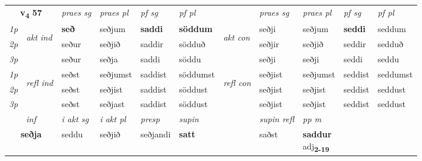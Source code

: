 \noindent
\begin{tabular}{lllllllllll} \toprule
\multicolumn{2}{c}{\textbf{v{\textsubscript{4}}} \Large{\textbf{57}}}  &  \textit{praes sg}  & \textit{praes pl}  &\textit{ pf sg} & \textit{pf pl} &  &  \textit{praes sg}  & \textit{praes pl}  & \textit{pf sg} & \textit{pf pl } \\*
	\cmidrule{3-6} \cmidrule{8-11}
 {\textit{1p}} & \multirow{3}{*}{\begin{turn}{90}\textit{akt ind}\end{turn}} & \textbf{seð} & seðjum & \textbf{saddi} & \textbf{söddum} & \multirow{3}{*}{\begin{turn}{90}\textit{akt con}\end{turn}} &seðji & seðjum & \textbf{seddi} & seddum\\*
 {\textit{2p}} &  &  seður  & seðjið & saddir & södduð & & seðjir & seðjið & seddir & sedduð \\*
{\textit{3p}} &  & seður & seðja & saddi & söddu & & seðji & seðji& seddi & seddu \\*
\cmidrule{3-6} \cmidrule{8-11}
 {\textit{1p}} & \multirow{3}{*}{\begin{turn}{90}\textit{refl ind}\end{turn}}  & seðst & seðjumst & saddist & söddumst & \multirow{3}{*}{\begin{turn}{90}\textit{refl con}\end{turn}}  &seðjist & seðjumst & seddist & seddumst \\*
 {\textit{2p}} &  & seðst & seðjist & saddist & söddust & &seðjist & seðjist & seddist & seddust \\*
 {\textit{3p}}  & & seðst & seðjast & saddist & söddust & & seðjist & seðjist& seddist & seddust \\*
\cmidrule{3-6} \cmidrule{8-11}

   \multicolumn{2}{c}{\textit{inf}}  & \textit{i akt sg} & \textit{i akt pl}   & \textit{presp} & \textit{supin} && \textit{supin refl} & \textit{pp m} \\*
  \multicolumn{2}{c}{\textbf{seðja}} & seddu  & seðjið   & seðjandi &  \textbf{satt} && saðst & \specialcell{\textbf{saddur} \\ adj\textbf{\textsubscript{2-19}}} \\*
\end{tabular}


